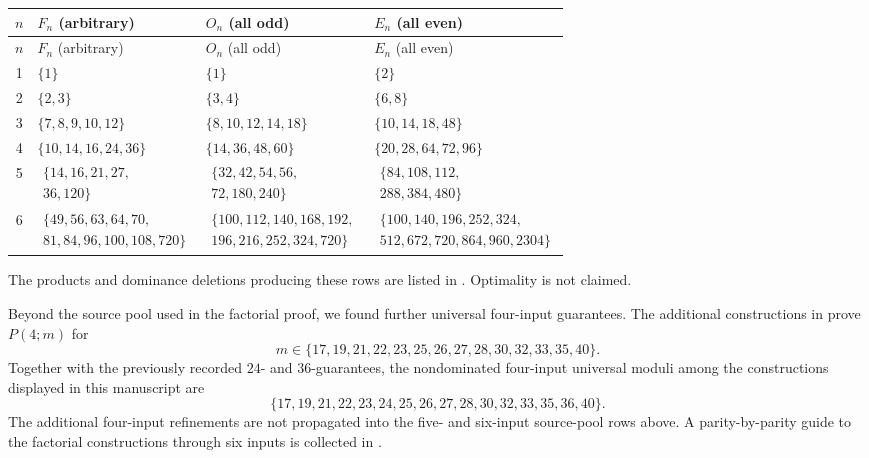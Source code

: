\documentclass[11pt]{amsart}
\theoremstyle{definition}
\theoremstyle{remark}
\begin{document}
\small
\begin{longtable}{@{}c>{\raggedright\arraybackslash}p{}>{\raggedright\arraybackslash}p{}>{\raggedright\arraybackslash}p{}@{}}
\toprule
$n$ & $F_n$ (arbitrary) & $O_n$ (all odd) & $E_n$ (all even) \\
\midrule
\endfirsthead
\toprule
$n$ & $F_n$ (arbitrary) & $O_n$ (all odd) & $E_n$ (all even) \\
\midrule
\endhead
1 & $\{1\}$ & $\{1\}$ & $\{2\}$ \\
2 & $\{2,3\}$ & $\{3,4\}$ & $\{6,8\}$ \\
3 & $\{7,8,9,10,12\}$ & $\{8,10,12,14,18\}$ & $\{10,14,18,48\}$ \\
4 & $\{10,14,16,24,36\}$ & $\{14,36,48,60\}$ & $\{20,28,64,72,96\}$ \\
5 & $\begin{gathered}\{14,16,21,27,\\36,120\}\end{gathered}$ & $\begin{gathered}\{32,42,54,56,\\72,180,240\}\end{gathered}$ & $\begin{gathered}\{84,108,112,\\288,384,480\}\end{gathered}$ \\
6 & $\begin{gathered}\{49,56,63,64,70,\\81,84,96,100,108,720\}\end{gathered}$ & $\begin{gathered}\{100,112,140,168,192,\\196,216,252,324,720\}\end{gathered}$ & $\begin{gathered}\{100,140,196,252,324,\\512,672,720,864,960,2304\}\end{gathered}$ \\
\bottomrule
\end{longtable}
\normalsize

The products and dominance deletions producing these rows are listed in
.  Optimality is not claimed.

Beyond the source pool used in the factorial proof, we found further universal
four-input guarantees.  The additional constructions in
 prove $P(4;m)$ for
\[
 m\in\{17,19,21,22,23,25,26,27,28,30,32,33,35,40\}.
\]
Together with the previously recorded $24$- and $36$-guarantees, the
nondominated four-input universal moduli among the constructions displayed in
this manuscript are
\[
 \{17,19,21,22,23,24,25,26,27,28,30,32,33,35,36,40\}.
\]
The additional four-input refinements are not propagated into the five- and
six-input source-pool rows above.  A parity-by-parity guide to the factorial
constructions through six inputs is collected in .
\end{document}
